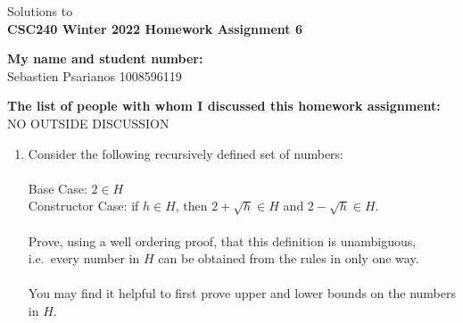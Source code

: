 \documentclass[11pt]{article}
\begin{document}
\begin{center}
Solutions to\\
{\bf \Large \bf CSC240 Winter 2022 Homework Assignment 6}
\end{center}

\noindent
{\bf My name and student number:}\\
Sebastien Psarianos 1008596119

\medskip

\noindent
{\bf The list of people with whom I discussed this homework assignment:}\\
NO OUTSIDE DISCUSSION


\begin{enumerate}
\item
\begin{question}
Consider the following  recursively defined set of numbers:\\
 \\
Base Case: $2 \in H$\\
Constructor Case: if $h \in H$, then $2+\sqrt{h}  \in H$ and $2-\sqrt{h} \in H$.\\
 \\
Prove, using a well ordering proof, that this definition is unambiguous,\\
i.e.~every number in $H$ can be obtained from the rules in only one way.\\
 \\
You may find it helpful to first prove upper and lower bounds on the numbers in $H$.
\end{question}


\end{enumerate}
\end{document}
